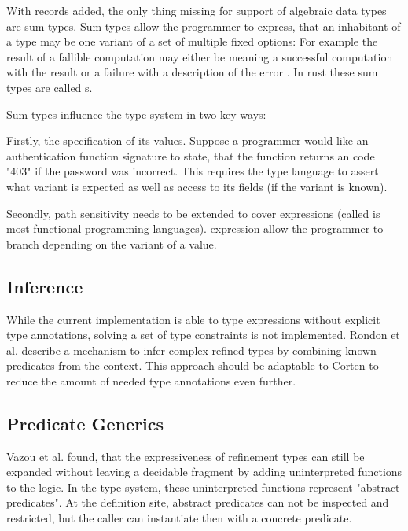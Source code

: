 \documentclass[twoside, english]{sdqthesis}
\theoremstyle{definition}
\begin{document}
With records added, the only thing missing for support of algebraic data types are sum types.
Sum types allow the programmer to express, that an inhabitant of a type may be one variant of a set of multiple fixed options: For example the result of a fallible computation may either be  meaning a successful computation with the result  or a failure  with a description of the error .
In rust these sum types are called s.

Sum types influence the type system in two key ways: 

Firstly, the specification of its values. Suppose a programmer would like an authentication function signature to state, that the function returns an  code "403" if the password was incorrect. This requires the type language to assert what variant is expected as well as access to its fields (if the variant is known).

Secondly, path sensitivity needs to be extended to cover  expressions (called  is most functional programming languages).  expression allow the programmer to branch depending on the variant of a value.

\subsection{Inference}

While the current implementation is able to type expressions without explicit type annotations, solving a set of type constraints is not implemented. 
Rondon et al. \cite{rondon_liquid_2008} describe a mechanism to infer complex refined types by combining known predicates from the context. This approach should be adaptable to Corten to reduce the amount of needed type annotations even further.


\subsection{Predicate Generics}

Vazou et al. \cite{vazou_abstract_2013} found, that the expressiveness of refinement types can still be expanded without leaving a decidable fragment by adding uninterpreted functions to the logic. In the type system, these uninterpreted functions represent "abstract predicates". At the definition site, abstract predicates can not be inspected and restricted, but the caller can instantiate then with a concrete predicate.
\end{document}
